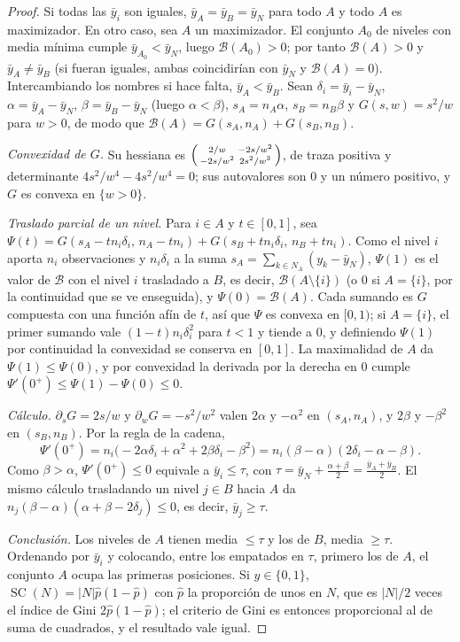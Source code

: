 \documentclass[11pt,a4paper]{article}
\theoremstyle{plain}
\theoremstyle{definition}
\theoremstyle{remark}
\newcommand{\SC}{\operatorname{SC}}
\newcommand{\1}{\mathbf{1}}
\begin{document}
\begin{proof}
Si todas las $\bar y_i$ son iguales, $\bar y_A=\bar y_B=\bar y_N$ para
todo $A$ y todo $A$ es maximizador. En otro caso, sea $A$ un maximizador.
El conjunto $A_0$ de niveles con media mínima cumple
$\bar y_{A_0}<\bar y_N$, luego $\mathcal B(A_0)>0$; por tanto
$\mathcal B(A)>0$ y $\bar y_A\ne\bar y_B$ (si fueran iguales, ambas
coincidirían con $\bar y_N$ y $\mathcal B(A)=0$). Intercambiando los
nombres si hace falta, $\bar y_A<\bar y_B$. Sean $\delta_i=\bar y_i-\bar y_N$,
$\alpha=\bar y_A-\bar y_N$, $\beta=\bar y_B-\bar y_N$ (luego
$\alpha<\beta$), $s_A=n_A\alpha$, $s_B=n_B\beta$ y $G(s,w)=s^2/w$ para
$w>0$, de modo que $\mathcal B(A)=G(s_A,n_A)+G(s_B,n_B)$.

\emph{Convexidad de $G$.} Su hessiana es
$\begin{psmallmatrix}2/w&-2s/w^2\\-2s/w^2&2s^2/w^3\end{psmallmatrix}$, de
traza positiva y determinante $4s^2/w^4-4s^2/w^4=0$; sus autovalores son
$0$ y un número positivo, y $G$ es convexa en $\{w>0\}$.

\emph{Traslado parcial de un nivel.} Para $i\in A$ y $t\in[0,1]$, sea
$\Psi(t)=G(s_A-tn_i\delta_i,\,n_A-tn_i)+G(s_B+tn_i\delta_i,\,n_B+tn_i)$. Como el nivel
$i$ aporta $n_i$ observaciones y $n_i\delta_i$ a la suma
$s_A=\sum_{k\in N_A}(y_k-\bar y_N)$, $\Psi(1)$ es el valor de $\mathcal
B$ con el nivel $i$ trasladado a $B$, es decir, $\mathcal B(A\setminus\{i\})$
(o $0$ si $A=\{i\}$, por la continuidad que se ve enseguida), y
$\Psi(0)=\mathcal B(A)$. Cada sumando es $G$ compuesta con una función
afín de $t$, así que $\Psi$ es convexa en $[0,1)$; si $A=\{i\}$, el primer
sumando vale $(1-t)n_i\delta_i^2$ para $t<1$ y tiende a $0$, y definiendo
$\Psi(1)$ por continuidad la convexidad se conserva en $[0,1]$. La
maximalidad de $A$ da $\Psi(1)\le\Psi(0)$, y por convexidad la derivada
por la derecha en $0$ cumple $\Psi'(0^+)\le\Psi(1)-\Psi(0)\le0$.

\emph{Cálculo.} $\partial_sG=2s/w$ y $\partial_wG=-s^2/w^2$ valen $2\alpha$ y
$-\alpha^2$ en $(s_A,n_A)$, y $2\beta$ y $-\beta^2$ en $(s_B,n_B)$. Por la
regla de la cadena,
\[
\Psi'(0^+)=n_i\bigl(-2\alpha \delta_i+\alpha^2+2\beta \delta_i-\beta^2\bigr)=n_i(\beta-\alpha)(2\delta_i-\alpha-\beta).
\]
Como $\beta>\alpha$, $\Psi'(0^+)\le0$ equivale a $\bar y_i\le\tau$, con
$\tau=\bar y_N+\frac{\alpha+\beta}2=\frac{\bar y_A+\bar y_B}2$. El mismo
cálculo trasladando un nivel $j\in B$ hacia $A$ da
$n_j(\beta-\alpha)(\alpha+\beta-2\delta_j)\le0$, es decir, $\bar y_j\ge\tau$.

\emph{Conclusión.} Los niveles de $A$ tienen media $\le\tau$ y los de $B$,
media $\ge\tau$. Ordenando por $\bar y_i$ y colocando, entre los empatados
en $\tau$, primero los de $A$, el conjunto $A$ ocupa las primeras
posiciones. Si $y\in\{0,1\}$, $\SC(N)=|N|\hat p(1-\hat p)$ con $\hat p$ la
proporción de unos en $N$, que es $|N|/2$ veces el índice de Gini
$2\hat p(1-\hat p)$; el criterio de Gini es entonces proporcional al de
suma de cuadrados, y el resultado vale igual.
\end{proof}
\end{document}
